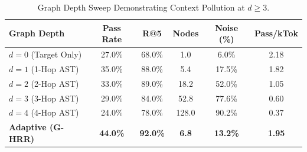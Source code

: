 \begin{table}[t]
\centering
\small
\caption{Graph Depth Sweep Demonstrating Context Pollution at $d \ge 3$.}
\label{tab:depth}
\begin{tabular}{lccccc}
\toprule
\textbf{Graph Depth} & \textbf{Pass Rate} & \textbf{R@5} & \textbf{Nodes} & \textbf{Noise (\%)} & \textbf{Pass/kTok} \\
\midrule
$d = 0$ (Target Only) & 27.0\% & 68.0\% & 1.0 & 6.0\% & 2.18 \\
$d = 1$ (1-Hop AST) & 35.0\% & 88.0\% & 5.4 & 17.5\% & 1.82 \\
$d = 2$ (2-Hop AST) & 33.0\% & 89.0\% & 18.2 & 52.0\% & 1.05 \\
$d = 3$ (3-Hop AST) & 29.0\% & 84.0\% & 52.8 & 77.6\% & 0.60 \\
$d = 4$ (4-Hop AST) & 24.0\% & 78.0\% & 128.0 & 90.2\% & 0.37 \\
\textbf{Adaptive (G-HRR)} & \textbf{44.0\%} & \textbf{92.0\%} & \textbf{6.8} & \textbf{13.2\%} & \textbf{1.95} \\
\bottomrule
\end{tabular}
\end{table}